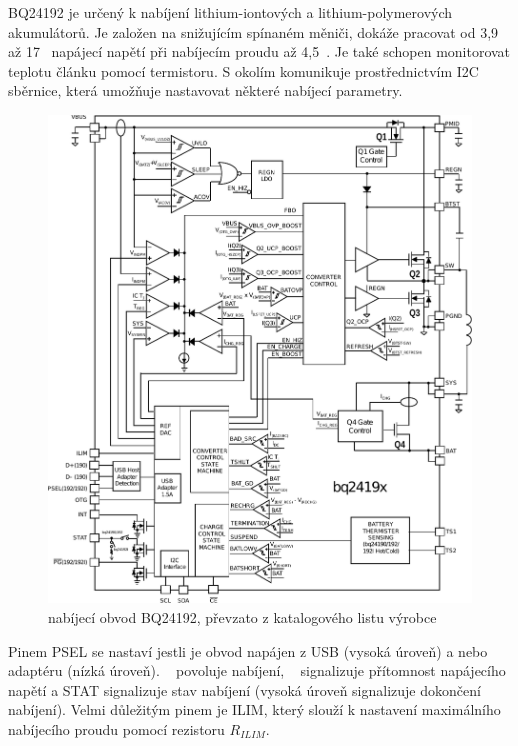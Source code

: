 BQ24192 je určený k nabíjení lithium-iontových a lithium-polymerových akumulátorů. Je založen na snižujícím spínaném měniči, dokáže pracovat od 3,9~ až 17~ napájecí napětí při nabíjecím proudu až 4,5~. Je také schopen monitorovat teplotu článku pomocí termistoru. S okolím komunikuje prostřednictvím I2C sběrnice, která umožňuje nastavovat některé nabíjecí parametry.

\begin{figure}[H]
    \begin{center}
        \includegraphics[width=\textwidth]{img/bq24192-block}
    \end{center}
    \caption{nabíjecí obvod BQ24192, převzato z katalogového listu výrobce}
\end{figure}

Pinem PSEL se nastaví jestli je obvod napájen z USB (vysoká úroveň) a nebo adaptéru (nízká úroveň). ~ povoluje nabíjení, ~ signalizuje přítomnost napájecího napětí a STAT signalizuje stav nabíjení (vysoká úroveň signalizuje dokončení nabíjení). Velmi důležitým pinem je ILIM, který slouží k nastavení maximálního nabíjecího proudu pomocí rezistoru $R_{ILIM}$.

